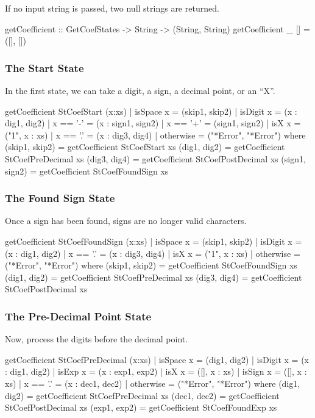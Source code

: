 If no input string is passed, two null strings are returned.
\begin{code}
getCoefficient :: GetCoefStates -> String -> (String, String)
getCoefficient _ [] = ([], [])
\end{code}
\subsubsection{The Start State}
In the first state, we can take a digit, a sign, a decimal point, or an ``X''.
\begin{code}
getCoefficient StCoefStart (x:xs)
  | isSpace x = (skip1, skip2)
  | isDigit x = (x : dig1, dig2)
  | x == '-'  = (x : sign1, sign2)
  | x == '+'  = (sign1, sign2)
  | isX x     = ("1", x : xs)
  | x == '.'  = (x : dig3, dig4)
  | otherwise = ("*Error", "*Error")
    where
      (skip1, skip2) = getCoefficient StCoefStart xs
      (dig1, dig2) = getCoefficient StCoefPreDecimal xs
      (dig3, dig4) = getCoefficient StCoefPostDecimal xs
      (sign1, sign2) = getCoefficient StCoefFoundSign xs
\end{code}
\subsubsection{The Found Sign State}
Once a sign has been found, signs are no longer valid characters.
\begin{code}
getCoefficient StCoefFoundSign (x:xs)
  | isSpace x = (skip1, skip2)
  | isDigit x = (x : dig1, dig2)
  | x == '.'  = (x : dig3, dig4)
  | isX x     = ("1", x : xs)
  | otherwise = ("*Error", "*Error")
    where
      (skip1, skip2) = getCoefficient StCoefFoundSign xs
      (dig1, dig2) = getCoefficient StCoefPreDecimal xs
      (dig3, dig4) = getCoefficient StCoefPostDecimal xs
\end{code}
\subsubsection{The Pre-Decimal Point State}
Now, process the digits before the decimal point.
\begin{code}
getCoefficient StCoefPreDecimal (x:xs)
  | isSpace x = (dig1, dig2)
  | isDigit x = (x : dig1, dig2)
  | isExp x   = (x : exp1, exp2)
  | isX x     = ([], x : xs)
  | isSign x  = ([], x : xs)
  | x == '.'  = (x : dec1, dec2)
  | otherwise = ("*Error", "*Error")
    where
      (dig1, dig2) = getCoefficient StCoefPreDecimal xs
      (dec1, dec2) = getCoefficient StCoefPostDecimal xs
      (exp1, exp2) = getCoefficient StCoefFoundExp xs
\end{code}

